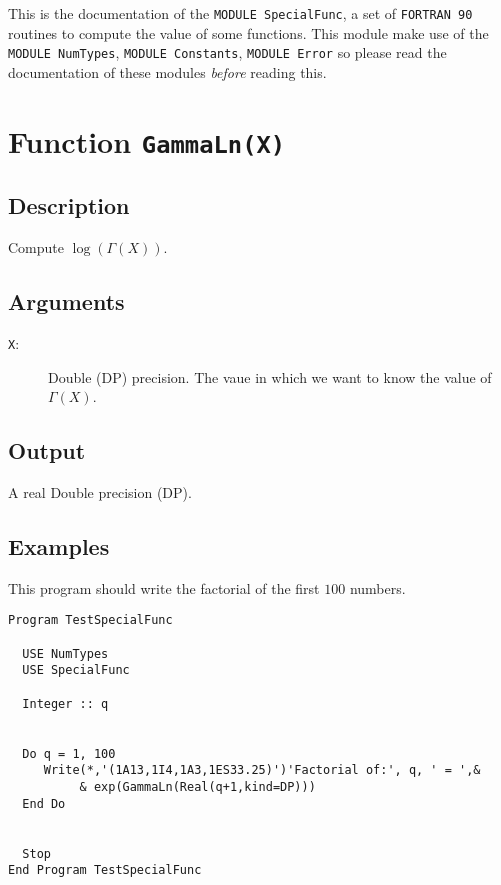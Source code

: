 This is the documentation of the \texttt{MODULE SpecialFunc}, a set
of \texttt{FORTRAN 90} routines to compute the value of some
functions. This module make use of the \texttt{MODULE NumTypes},
\texttt{MODULE Constants}, \texttt{MODULE Error} so please read the
documentation of these modules \emph{before} reading this.

\section{Function \texttt{GammaLn(X)}}

\subsection{Description}

Compute $\log(\Gamma(X))$.

\subsection{Arguments}

\begin{description}
\item[\texttt{X}:] Double (DP) precision. The vaue in which we want to
  know the value of $\Gamma(X)$.
\end{description}

\subsection{Output}

A real Double precision (DP).

\subsection{Examples}

This program should write the factorial of the first $100$ numbers.

\begin{verbatim}
Program TestSpecialFunc

  USE NumTypes
  USE SpecialFunc

  Integer :: q


  Do q = 1, 100
     Write(*,'(1A13,1I4,1A3,1ES33.25)')'Factorial of:', q, ' = ',&
          & exp(GammaLn(Real(q+1,kind=DP)))
  End Do


  Stop
End Program TestSpecialFunc

\end{verbatim}


